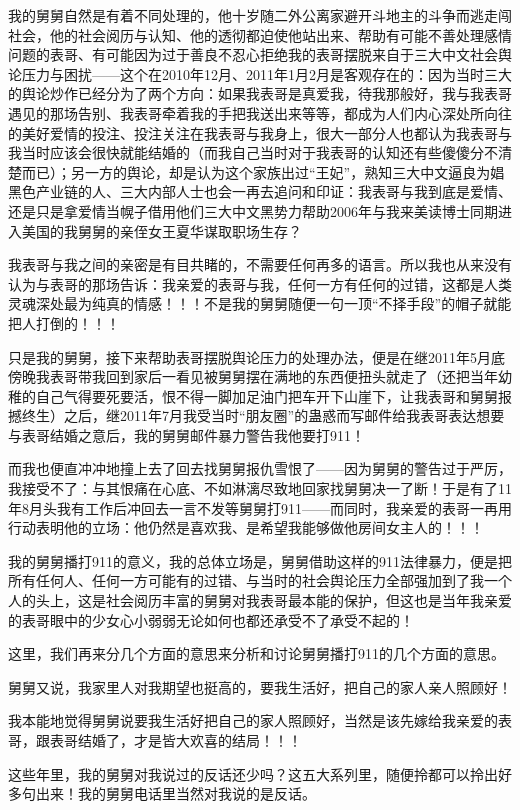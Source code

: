 \documentclass[9pt, b5paper]{article}
\begin{document}
我的舅舅自然是有着不同处理的，他十岁随二外公离家避开斗地主的斗争而逃走闯社会，他的社会阅历与认知、他的透彻都迫使他站出来、帮助有可能不善处理感情问题的表哥、有可能因为过于善良不忍心拒绝我的表哥摆脱来自于三大中文社会舆论压力与困扰——这个在2010年12月、2011年1月2月是客观存在的：因为当时三大的舆论炒作已经分为了两个方向：如果我表哥是真爱我，待我那般好，我与我表哥遇见的那场告别、我表哥牵着我的手把我送出来等等，都成为人们内心深处所向往的美好爱情的投注、投注关注在我表哥与我身上，很大一部分人也都认为我表哥与我当时应该会很快就能结婚的（而我自己当时对于我表哥的认知还有些傻傻分不清楚而已）；另一方的舆论，却是认为这个家族出过“王妃”，熟知三大中文逼良为娼黑色产业链的人、三大内部人士也会一再去追问和印证：我表哥与我到底是爱情、还是只是拿爱情当幌子借用他们三大中文黑势力帮助2006年与我来美读博士同期进入美国的我舅舅的亲侄女王夏华谋取职场生存？

我表哥与我之间的亲密是有目共睹的，不需要任何再多的语言。所以我也从来没有认为与表哥的那场告诉：我亲爱的表哥与我，任何一方有任何的过错，这都是人类灵魂深处最为纯真的情感！！！不是我的舅舅随便一句一顶“不择手段”的帽子就能把人打倒的！！！

只是我的舅舅，接下来帮助表哥摆脱舆论压力的处理办法，便是在继2011年5月底傍晚我表哥带我回到家后一看见被舅舅摆在满地的东西便扭头就走了（还把当年幼稚的自己气得要死要活，恨不得一脚加足油门把车开下山崖下，让我表哥和舅舅报撼终生）之后，继2011年7月我受当时“朋友圈”的蛊惑而写邮件给我表哥表达想要与表哥结婚之意后，我的舅舅邮件暴力警告我他要打911！

而我也便直冲冲地撞上去了回去找舅舅报仇雪恨了——因为舅舅的警告过于严厉，我接受不了：与其恨痛在心底、不如淋漓尽致地回家找舅舅决一了断！于是有了11年8月头我有工作后冲回去一言不发等舅舅打911——而同时，我亲爱的表哥一再用行动表明他的立场：他仍然是喜欢我、是希望我能够做他房间女主人的！！！

我的舅舅播打911的意义，我的总体立场是，舅舅借助这样的911法律暴力，便是把所有任何人、任何一方可能有的过错、与当时的社会舆论压力全部强加到了我一个人的头上，这是社会阅历丰富的舅舅对我表哥最本能的保护，但这也是当年我亲爱的表哥眼中的少女心小弱弱无论如何也都还承受不了承受不起的！

这里，我们再来分几个方面的意思来分析和讨论舅舅播打911的几个方面的意思。 

舅舅又说，我家里人对我期望也挺高的，要我生活好，把自己的家人亲人照顾好！

我本能地觉得舅舅说要我生活好把自己的家人照顾好，当然是该先嫁给我亲爱的表哥，跟表哥结婚了，才是皆大欢喜的结局！！！

这些年里，我的舅舅对我说过的反话还少吗？这五大系列里，随便拎都可以拎出好多句出来！我的舅舅电话里当然对我说的是反话。 
\end{document}
